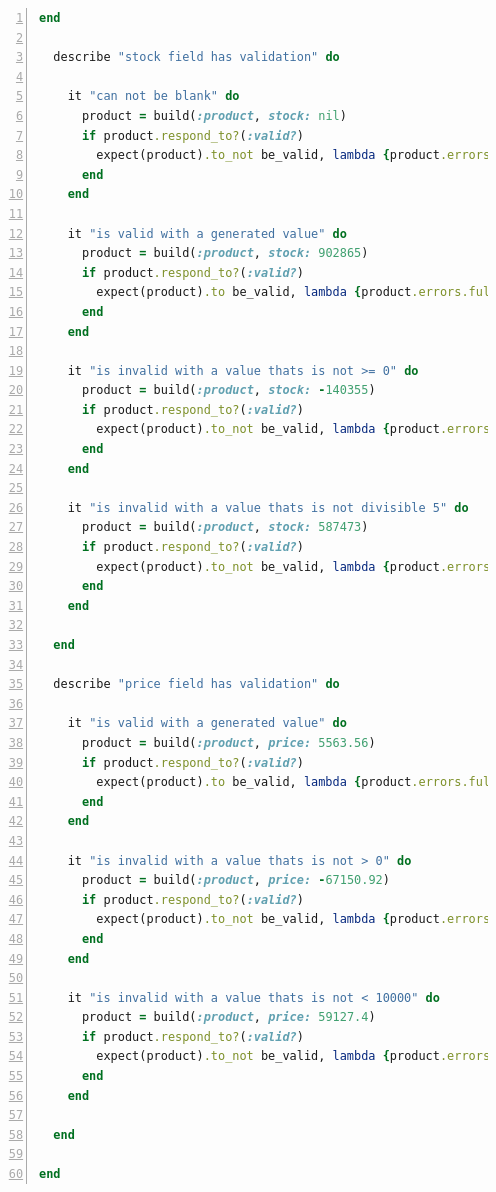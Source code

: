 \documentclass[a4paper,12pt]{article}
\begin{document}
\begin{lstlisting}[frame=single,numbers=left,language = ruby,caption= {Test suite output for Product defined in chapter 6}, label={code:nice}]
  end

  describe "stock field has validation" do

    it "can not be blank" do 
      product = build(:product, stock: nil)
      if product.respond_to?(:valid?)
        expect(product).to_not be_valid, lambda {product.errors.full_messages.join("\n")}
      end
    end

    it "is valid with a generated value" do
      product = build(:product, stock: 902865)
      if product.respond_to?(:valid?)
        expect(product).to be_valid, lambda {product.errors.full_messages.join("\n")}
      end
    end

    it "is invalid with a value thats is not >= 0" do
      product = build(:product, stock: -140355)
      if product.respond_to?(:valid?)
        expect(product).to_not be_valid, lambda {product.errors.full_messages.join("\n")}
      end
    end

    it "is invalid with a value thats is not divisible 5" do
      product = build(:product, stock: 587473)
      if product.respond_to?(:valid?)
        expect(product).to_not be_valid, lambda {product.errors.full_messages.join("\n")}
      end
    end

  end

  describe "price field has validation" do

    it "is valid with a generated value" do
      product = build(:product, price: 5563.56)
      if product.respond_to?(:valid?)
        expect(product).to be_valid, lambda {product.errors.full_messages.join("\n")}
      end
    end

    it "is invalid with a value thats is not > 0" do
      product = build(:product, price: -67150.92)
      if product.respond_to?(:valid?)
        expect(product).to_not be_valid, lambda {product.errors.full_messages.join("\n")}
      end
    end

    it "is invalid with a value thats is not < 10000" do
      product = build(:product, price: 59127.4)
      if product.respond_to?(:valid?)
        expect(product).to_not be_valid, lambda {product.errors.full_messages.join("\n")}
      end
    end

  end

end
\end{lstlisting}



\end{document}
